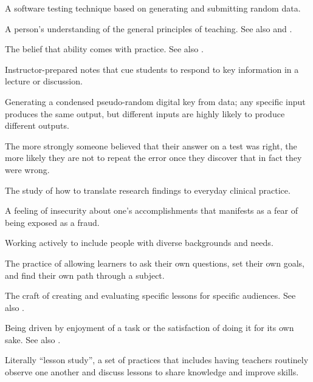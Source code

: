 \begin{description}
 A software testing technique based on
generating and submitting random data.

 A
person's understanding of the general principles of teaching. See also
and .

 The belief that ability comes with
practice. See also .

 Instructor-prepared notes that cue
students to respond to key information in a lecture or discussion.

 Generating a condensed pseudo-random digital key
from data; any specific input produces the same output, but different inputs are
highly likely to produce different outputs.

 The more strongly someone
believed that their answer on a test was right, the more likely they are not to
repeat the error once they discover that in fact they were wrong.

 The study of how to
translate research findings to everyday clinical practice.

 A feeling of insecurity about
one's accomplishments that manifests as a fear of being exposed as a fraud.

 Working actively to include people with
diverse backgrounds and needs.

 The practice of
allowing learners to ask their own questions, set their own goals, and find
their own path through a subject.

 The craft of creating and
evaluating specific lessons for specific audiences. See also
.

 Being driven by enjoyment
of a task or the satisfaction of doing it for its own sake.  See also
.

 Literally ``lesson study'', a set of
practices that includes having teachers routinely observe one another and
discuss lessons to share knowledge and improve skills.


\end{description}
